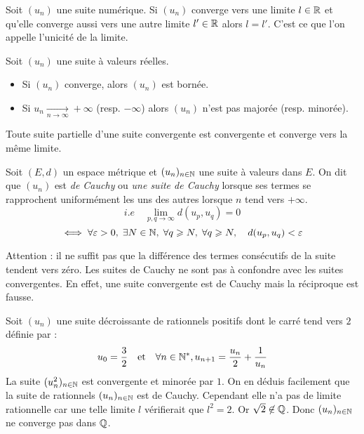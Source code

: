 \begin{prop}
    Soit $(u_n)$ une suite numérique. 
    Si $(u_n)$ converge vers une limite $l \in \mathbb{R}$ et qu'elle converge aussi vers une autre limite $l' \in \mathbb{R}$ alors 
    $l = l'$. C'est ce que l'on appelle l'unicité de la limite. 
\end{prop}

\begin{prop}
    Soit $(u_n)$ une suite à valeurs réelles. 
    \begin{itemize}
        \item Si $(u_n)$ converge, alors $(u_n)$ est bornée. 
        \item Si $u_n \underset{n \to \infty}{\longrightarrow} + \infty$ (resp. $- \infty$) alors $(u_n)$ n'est pas majorée (resp. minorée). 
    \end{itemize}
\end{prop}

\begin{prop}
    Toute suite partielle d'une suite convergente est convergente et converge vers la même limite. 
\end{prop}

\begin{definition}
    Soit $(E,d)$ un espace métrique et $(u_n)_{n \in \mathbb{N}}$ une suite à valeurs dans $E$. 
    On dit que $(u_n)$ est \emph{de Cauchy} ou \emph{une suite de Cauchy} lorsque ses termes 
    se rapprochent uniformément les uns des autres lorsque $n$ tend vers $ + \infty$. 
        \[ i.e \quad \lim_{p,q \to \infty} d(u_p, u_q) = 0 \] 
        \[ \iff \forall \varepsilon > 0, \; \exists N \in \mathbb{N}, \; \forall q \geqslant N, \; \forall q \geqslant N, \quad d(u_p,u_q) < \varepsilon \]  
\end{definition}

\begin{remark}
    Attention : il ne suffit pas que la différence des termes consécutifs de la suite tendent vers zéro. 
    Les suites de Cauchy ne sont pas à confondre avec les suites convergentes. En effet, une suite convergente 
    est de Cauchy mais la réciproque est fausse. 
\end{remark}

\begin{example}
    Soit $(u_n)$ une suite décroissante de rationnels positifs dont le carré tend vers $2$ définie par : 
        \[ u_0 = \frac{3}{2} \quad \text{et} \quad \forall n \in \mathbb{N}^*, u_{n+1} = \frac{u_n}{2} + \frac{1}{u_n} \] 
    La suite $(u_n^2)_{n \in \mathbb{N}}$ est convergente et minorée par $1$. On en déduis facilement que la suite de rationnels 
    $(u_n)_{n \in \mathbb{N}}$ est de Cauchy. Cependant elle n'a pas de limite rationnelle car une telle limite $l$ 
    vérifierait que $l^2 = 2$. Or $\sqrt{2} \not \in \mathbb{Q}$. Donc $(u_n)_{n \in \mathbb{N}}$ ne converge pas dans $\mathbb{Q}$. 
\end{example}

